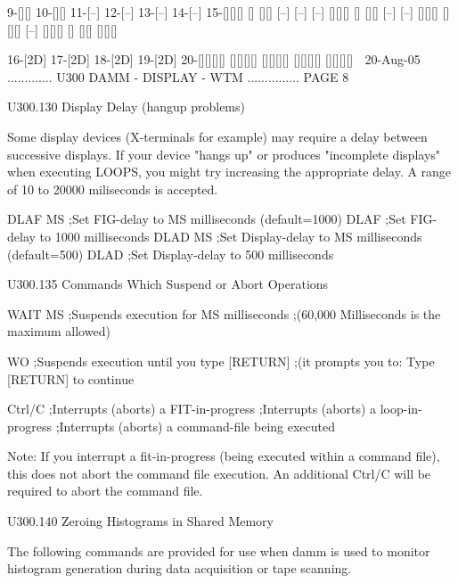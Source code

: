     9-[][]  10-[][]  11-[--]  12-[--]  13-[--]  14-[--]  15-[][][]
      []       [][]              [--]     [--]     [--]     [][][]
      []       [][]                       [--]     [--]     [][][]
      []       [][]                                [--]     [][][]
      []       [][]                                         [][][]
 
   16-[2D]  17-[2D]  18-[2D]  19-[2D]  20-[][][][]
                                          [][][][]
                                          [][][][]
                                          [][][][]
                                          [][][][]
    
   20-Aug-05 ............. U300  DAMM - DISPLAY - WTM ............... PAGE   8
 
 
   U300.130  Display Delay (hangup problems)
 
   Some display devices (X-terminals for example) may require a delay  between
   successive  displays.  If  your  device  "hangs up" or produces "incomplete
   displays" when executing LOOPS, you might try  increasing  the  appropriate
   delay. A range of 10 to 20000 miliseconds is accepted.
 
   DLAF MS        ;Set FIG-delay     to MS   milliseconds (default=1000)
   DLAF           ;Set FIG-delay     to 1000 milliseconds
   DLAD MS        ;Set Display-delay to MS   milliseconds (default=500)
   DLAD           ;Set Display-delay to 500  milliseconds
 
 
   U300.135  Commands Which Suspend or Abort Operations
 
   WAIT  MS             ;Suspends execution for MS milliseconds
                        ;(60,000 Milliseconds is the maximum allowed)
 
   WO                   ;Suspends execution until you  type [RETURN]
                        ;(it prompts you to: Type [RETURN] to continue
 
   Ctrl/C               ;Interrupts (aborts) a FIT-in-progress
                        ;Interrupts (aborts) a loop-in-progress
                        ;Interrupts (aborts) a command-file being executed
 
   Note:  If  you interrupt a fit-in-progress (being executed within a command
   file), this does not  abort  the  command  file  execution.  An  additional
   Ctrl/C will be required to abort the command file.
 
 
   U300.140  Zeroing Histograms in Shared Memory
 
   The  following  commands  are provided for use when damm is used to monitor
   histogram generation during data acquisition or tape scanning.
 

